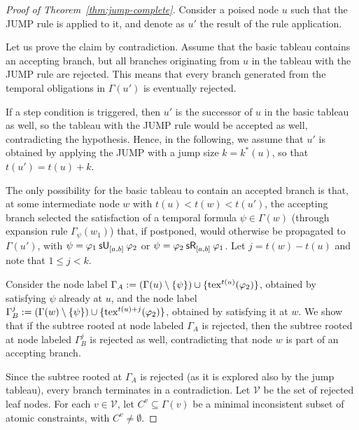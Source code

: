 \documentclass{easychair}
\begin{document}
\begin{proof}[Proof of Theorem~\ref{thm:jump-complete}]
    Consider a poised node $u$ such that the \textsf{JUMP} rule is applied to it, and denote as $u'$ the result of the rule application.
    
    Let us prove the claim by contradiction.
    Assume that the basic tableau contains an accepting branch, but all branches originating from $u$ in the tableau with the \textsf{JUMP} rule are rejected.
    This means that every branch generated from the temporal obligations in $\Gamma(u')$ is eventually rejected. 

    If a step condition is triggered, then $u'$ is the successor of $u$ in the basic tableau as well, so the tableau with the \textsf{JUMP} rule would be accepted as well, contradicting the hypothesis. Hence, in the following, we assume that $u'$ is obtained by applying the \textsf{JUMP} with a jump size $k = k^{\ast}(u)$, so that $t(u') = t(u) + k$.

    The only possibility for the basic tableau to contain an accepted branch is that, at some intermediate node $w$ with $t(u) < t(w) < t(u')$, the accepting branch selected the satisfaction of a temporal formula $\psi \in \Gamma(w)$ (through expansion rule $\Gamma_{\psi}(w_1)$) that, if postponed, would otherwise be propagated to $\Gamma(u')$, with $\psi = \suntil{[a,b]}{\varphi_1}{\varphi_2}$ or $\psi = \srelease{[a,b]}{\varphi_2}{\varphi_1}$.
    Let $j = t(w) - t(u)$ and note that $1 \leq j < k$. 

    Consider the node label $\Gamma_A := (\Gamma(u) \setminus \set{\psi}) \cup \set{\exp^{t(u)}(\varphi_2)}$, obtained by satisfying $\psi$ already at $u$, and the node label $\Gamma_B^j := (\Gamma(w) \setminus \set{\psi}) \cup \set{\exp^{t(u)+j}(\varphi_2)}$, obtained by satisfying it at $w$.
    We show that if the subtree rooted at node labeled $\Gamma_A$ is rejected, then the subtree rooted at node labeled $\Gamma_B^j$ is rejected as well, contradicting that node $w$ is part of an accepting branch.
    
    Since the subtree rooted at $\Gamma_A$ is rejected (as it is explored also by the jump tableau), every branch terminates in a contradiction. Let $\mathcal{V}$ be the set of rejected leaf nodes. For each $v \in \mathcal{V}$, let $C^v \subseteq \Gamma(v)$ be a minimal inconsistent subset of atomic constraints, with $C^v \neq \emptyset$. 


\end{proof}
\end{document}
